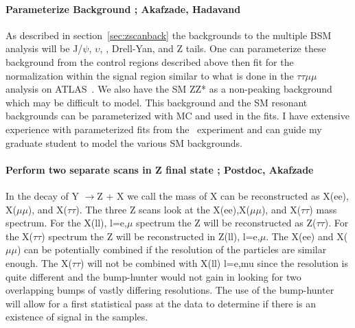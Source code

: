 \documentclass[11pt]{article}
\newcommand{\too}{$\rightarrow$}
\begin{document}
\paragraph{Parameterize Background ;  Akafzade, Hadavand} %
As described in section~\ref{sec:zscanback} the backgrounds to the multiple BSM analysis  will be J/$\psi$, $\upsilon$, \ttbar, Drell-Yan, and Z tails.  One can 
parameterize these background from the control regions described above then fit for the normalization within the signal region similar to what is done in the
$\tau\tau \mu \mu$ analysis on ATLAS~\cite{tautaumumu}.  We also have the SM ZZ* as a non-peaking background which may be difficult to model. This background and the SM resonant backgrounds 
can be parameterized with MC and used in the fits. I have extensive experience with parameterized fits from the \babar\ experiment and can guide my graduate student to model the various SM backgrounds.

\paragraph{Perform two separate scans in Z final state ;  Postdoc, Akafzade} %
In the decay of Y \too Z + X we call the mass of X can be reconstructed as X(ee), X($\mu\mu$), and X($\tau\tau$).  
The three Z scans look at the X(ee),X($\mu\mu$), and X($\tau\tau$) mass spectrum. For the X(ll), l=e,$\mu$ spectrum the Z will be reconstructed as Z($\tau\tau$).  For the X($\tau\tau$) spectrum the Z will be reconstructed in Z(ll), l=e,$\mu$.  
The X(ee) and X($\mu\mu$) can be potentially combined if the resolution of the particles are similar enough.  The X($\tau\tau$) will not be combined with X(ll) l=e,mu since the resolution is quite different and the bump-hunter would not gain in looking for two overlapping bumps of vastly differing resolutions.
The use of the bump-hunter will allow for a first statistical pass at the data to determine if there is an existence of signal in the samples.  
\end{document}
